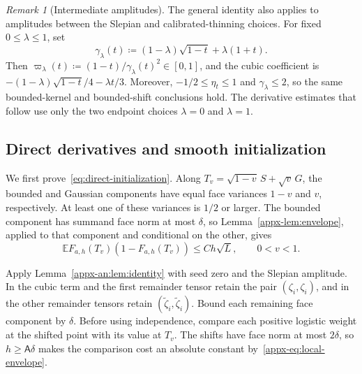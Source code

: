 \documentclass[11pt,letterpaper]{article}
\theoremstyle{remark}
\newtheorem{remark}{Remark}
\newcommand{\E}{\mathbb E}
\begin{document}
\begin{remark}[Intermediate amplitudes]
The general identity also applies to amplitudes between the Slepian
and calibrated-thinning choices. For fixed \(0\le\lambda\le1\), set
\[
 \gamma_\lambda(t)\coloneqq
 (1-\lambda)\sqrt{1-t}+\lambda(1+t).
\]
Then \(\varpi_\lambda(t)\coloneqq(1-t)/\gamma_\lambda(t)^2\in[0,1]\),
and the cubic coefficient is
\(- (1-\lambda)\sqrt{1-t}/4-\lambda t/3\).
Moreover, \(-1/2\le\eta_t\le1\) and \(\gamma_\lambda\le2\),
so the same bounded-kernel and bounded-shift conclusions hold.
The derivative estimates that follow use only the two endpoint
choices \(\lambda=0\) and \(\lambda=1\).
\end{remark}

\subsection{Direct derivatives and smooth initialization}
\label{appx-an:sec:initialization}

We first prove~\eqref{eq:direct-initialization}. Along
\(T_v=\sqrt{1-v}\,S+\sqrt v\,G\), the bounded and Gaussian
components have equal face variances \(1-v\) and \(v\), respectively.
At least one of these variances is \(1/2\) or larger. The bounded
component has summand face
norm at most \(\delta\), so Lemma~\ref{appx-lem:envelope}, applied
to that component and conditional on the other, gives
\begin{equation}
 \E F_{a,h}(T_v)(1-F_{a,h}(T_v))\le Ch\sqrt L,
 \qquad 0<v<1.
 \label{eq:slepian-weight}
\end{equation}

Apply Lemma~\ref{appx-an:lem:identity} with seed zero and the Slepian
amplitude. In the cubic term and the first remainder tensor retain
the pair \((\zeta_i,\zeta_i)\), and in the other remainder tensors
retain \((\widetilde\zeta_i,\widetilde\zeta_i)\). Bound each
remaining face component by \(\delta\). Before using independence,
compare each positive logistic weight at the shifted point with its
value at \(T_v\). The shifts have face norm at most \(2\delta\),
so \(h\ge\mathsf A\delta\) makes the comparison cost an absolute
constant by~\eqref{appx-eq:local-envelope}.
\end{document}
